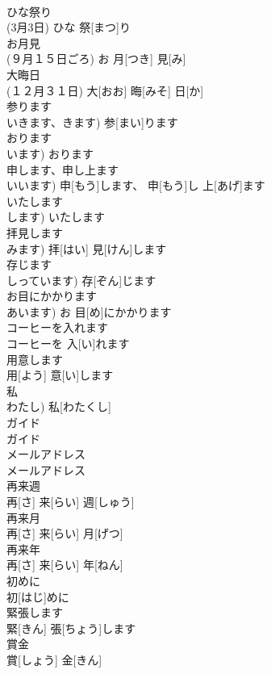 \documentclass[8pt]{extreport}
\begin{document}
\begin{CJK}{UTF8}{min}
\\	ひな祭り	
\\	(3月3日)	ひな 祭[まつ]り		
\\	お月見	
\\	(９月１５日ごろ)	お 月[つき] 見[み]		
\\	大晦日	
\\	(１２月３１日)	大[おお] 晦[みそ] 日[か]		
\\	参ります	
\\	いきます、きます)	参[まい]ります		
\\	おります	
\\	います)	おります		
\\	申します、申し上ます	
\\	いいます)	申[もう]します、 申[もう]し 上[あげ]ます		
\\	いたします	
\\	します)	いたします		
\\	拝見します	
\\	みます)	拝[はい] 見[けん]します		
\\	存じます	
\\	しっています)	存[ぞん]じます		
\\	お目にかかります	
\\	あいます)	お 目[め]にかかります		
\\	コーヒーを入れます	
\\	コーヒーを 入[い]れます		
\\	用意します	
\\	用[よう] 意[い]します		
\\	私
\\	わたし)	私[わたくし]		
\\	ガイド	
\\	ガイド		
\\	メールアドレス	
\\	メールアドレス		
\\	再来週	
\\	再[さ] 来[らい] 週[しゅう]		
\\	再来月	
\\	再[さ] 来[らい] 月[げつ]		
\\	再来年	
\\	再[さ] 来[らい] 年[ねん]		
\\	初めに	
\\	初[はじ]めに		
\\	緊張します	
\\	緊[きん] 張[ちょう]します		
\\	賞金	
\\	賞[しょう] 金[きん]		

\end{CJK}
\end{document}
